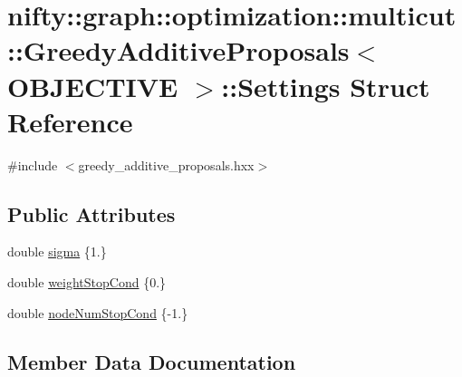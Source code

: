 \hypertarget{structnifty_1_1graph_1_1optimization_1_1multicut_1_1GreedyAdditiveProposals_1_1Settings}{}\section{nifty\+:\+:graph\+:\+:optimization\+:\+:multicut\+:\+:Greedy\+Additive\+Proposals$<$ O\+B\+J\+E\+C\+T\+I\+V\+E $>$\+:\+:Settings Struct Reference}
\label{structnifty_1_1graph_1_1optimization_1_1multicut_1_1GreedyAdditiveProposals_1_1Settings}


{\ttfamily \#include $<$greedy\+\_\+additive\+\_\+proposals.\+hxx$>$}

\subsection*{Public Attributes}
\begin{DoxyCompactItemize}
\item 
double \hyperlink{structnifty_1_1graph_1_1optimization_1_1multicut_1_1GreedyAdditiveProposals_1_1Settings_ac5c585589c27b863b9115faac8724c47}{sigma} \{1.\}
\item 
double \hyperlink{structnifty_1_1graph_1_1optimization_1_1multicut_1_1GreedyAdditiveProposals_1_1Settings_ae1fee66127072c3aee62635fd016ca6c}{weight\+Stop\+Cond} \{0.\}
\item 
double \hyperlink{structnifty_1_1graph_1_1optimization_1_1multicut_1_1GreedyAdditiveProposals_1_1Settings_a90c4649e0ba19d2305535c0d938a7082}{node\+Num\+Stop\+Cond} \{-\/1.\}
\end{DoxyCompactItemize}


\subsection{Member Data Documentation}
\hypertarget{structnifty_1_1graph_1_1optimization_1_1multicut_1_1GreedyAdditiveProposals_1_1Settings_a90c4649e0ba19d2305535c0d938a7082}{}
